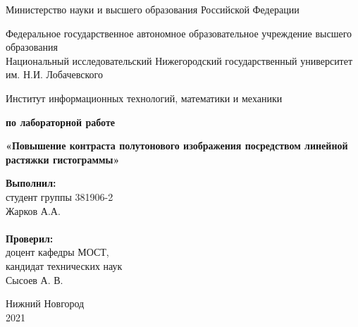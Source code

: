 \documentclass{report}
\begin{document}
\begin{titlepage}

\begin{center}
Министерство науки и высшего образования Российской Федерации
\end{center}

\begin{center}
Федеральное государственное автономное образовательное учреждение высшего образования \\
Национальный исследовательский Нижегородский государственный университет им. Н.И. Лобачевского
\end{center}

\begin{center}
Институт информационных технологий, математики и механики
\end{center}

\vspace{4em}

\begin{center}
\textbf{ по лабораторной работе} \\
\end{center}
\begin{center}
\textbf{\Large«Повышение контраста полутонового изображения посредством линейной растяжки гистограммы»} \\
\end{center}

\vspace{4em}

\newbox{\lbox}
\newlength{\maxl}
\setlength{\maxl}{\wd\lbox}
\hfill\parbox{7cm}{
\hspace*{5cm}\hspace*{-5cm}\textbf{Выполнил:} \\ студент группы 381906-2 \\ Жарков А.А.\\
\\
\hspace*{5cm}\hspace*{-5cm}\textbf{Проверил:}\\ доцент кафедры МОСТ, \\ кандидат технических наук \\ Сысоев А. В.\\
}
\vspace{\fill}

\begin{center} Нижний Новгород \\ 2021 \end{center}

\end{titlepage}
\end{document}
